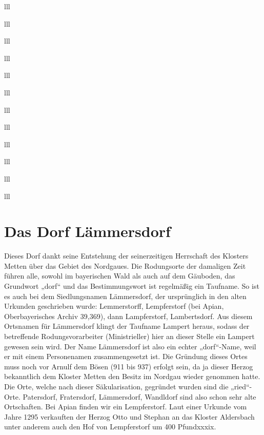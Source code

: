 \documentclass[12pt,a4pager]{book}
\begin{document}
\begin{tabuluar}{lll}
\begin{tabuluar}{lll}
\begin{tabuluar}{lll}
\begin{tabuluar}{lll}
\begin{tabuluar}{lll}
\begin{tabuluar}{lll}
\begin{tabuluar}{lll}
\begin{tabuluar}{lll}
\begin{tabuluar}{lll}
\begin{tabuluar}{lll}
\begin{tabuluar}{lll}
\begin{tabuluar}{lll}
\section{Das Dorf Lämmersdorf}

Dieses Dorf dankt seine Entstehung der seinerzeitigen Herrschaft des Klosters
Metten über das Gebiet des Nordgaues. Die Rodungsorte der damaligen Zeit führen
alle, sowohl im bayerischen Wald als auch auf dem Gäuboden, das Grundwort „dorf“
und das Bestimmungswort ist regelmäßig ein Taufname. So ist es auch bei dem
Siedlungsnamen Lämmersdorf, der ursprünglich in den alten Urkunden geschrieben
wurde: Lemmerstorff, Lempferstorf (bei Apian, Oberbayerisches Archiv 39,369),
dann Lampferstorf, Lambertsdorf. Aus diesem Ortsnamen für Lämmersdorf klingt der
Taufname Lampert heraus, sodass der betreffende Rodungsvorarbeiter
(Ministrieller) hier an dieser Stelle ein Lampert gewesen sein wird. Der Name
Lämmersdorf ist also ein echter „dorf“-Name, weil er mit einem Personenamen
zusammengesetzt ist. Die Gründung dieses Ortes muss noch vor Arnulf dem Bösen
(911 bis 937) erfolgt sein, da ja dieser Herzog bekanntlich dem Kloster Metten
den Besitz im Nordgau wieder genommen hatte. Die Orte, welche nach dieser
Säkularisation, gegründet wurden sind die „ried“-Orte. Patersdorf, Fratersdorf,
Lämmersdorf, Wandldorf sind also schon sehr alte Ortschaften. Bei Apian finden
wir ein Lempferstorf. Laut einer Urkunde vom Jahre 1295 verkauften der Herzog
Otto und Stephan an das Kloster Aldersbach unter anderem auch den Hof von
Lempferstorf um 400 Pfundxxxix.


\end{tabuluar}
\end{tabuluar}
\end{tabuluar}
\end{tabuluar}
\end{tabuluar}
\end{tabuluar}
\end{tabuluar}
\end{tabuluar}
\end{tabuluar}
\end{tabuluar}
\end{tabuluar}
\end{tabuluar}
\end{document}
